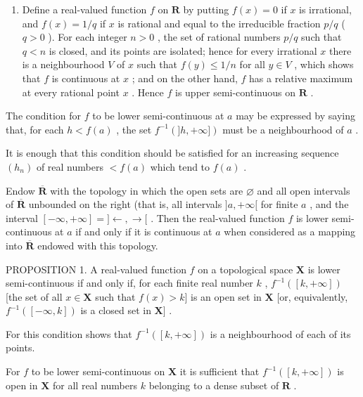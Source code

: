 \begin{enumerate}
\def\labelenumi{\arabic{enumi})}
\setcounter{enumi}{1}
\tightlist
\item
  Define a real-valued function \(f\) on \(\mathbf{R}\) by putting \(f(x) = 0\) if \(x\) is irrational, and \(f(x) = 1 / q\) if \(x\) is rational and equal to the irreducible fraction \(p / q\) ( \(q > 0\) ). For each integer \(n > 0\) , the set of rational numbers \(p / q\) such that \(q < n\) is closed, and its points are isolated; hence for every irrational \(x\) there is a neighbourhood \(V\) of \(x\) such that \(f(y) \leqslant 1 / n\) for all \(y \in V\) , which shows that \(f\) is continuous at \(x\) ; and on the other hand, \(f\) has a relative maximum at every rational point \(x\) . Hence \(f\) is upper semi-continuous on \(\mathbf{R}\) .
\end{enumerate}

The condition for \(f\) to be lower semi-continuous at \(a\) may be expressed by saying that, for each \(h < f(a)\) , the set \(f^{-1}(]h, +\infty])\) must be a neighbourhood of \(a\) .

It is enough that this condition should be satisfied for an increasing sequence \((h_{n})\) of real numbers \(<f(a)\) which tend to \(f(a)\) .

Endow \(\overline{\mathbf{R}}\) with the topology in which the open sets are \(\varnothing\) and all open intervals of \(\overline{\mathbf{R}}\) unbounded on the right (that is, all intervals \(]a, +\infty[\) for finite \(a\) , and the interval \([- \infty, +\infty] = ] \leftarrow, \rightarrow[\) . Then the real-valued function \(f\) is lower semi-continuous at \(a\) if and only if it is continuous at \(a\) when considered as a mapping into \(\overline{\mathbf{R}}\) endowed with this topology.

PROPOSITION 1. A real-valued function \(f\) on a topological space \(\mathbf{X}\) is lower semi-continuous if and only if, for each finite real number \(k\) , \(f^{-1}([k, +\infty])\) {[}the set of all \(x \in \mathbf{X}\) such that \(f(x) > k]\) is an open set in \(\mathbf{X}\) {[}or, equivalently, \(f^{-1}([- \infty, k])\) is a closed set in \(\mathbf{X}]\) .

For this condition shows that \(f^{-1}([k, +\infty])\) is a neighbourhood of each of its points.

For \(f\) to be lower semi-continuous on \(\mathbf{X}\) it is sufficient that \(f^{-1}([k, +\infty])\) is open in \(\mathbf{X}\) for all real numbers \(k\) belonging to a dense subset of \(\mathbf{R}\) .

